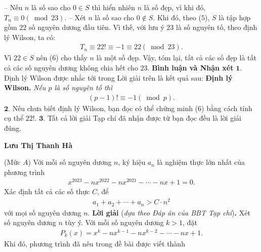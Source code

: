 \begin{multicols}{2}
	\vskip 0.05cm
	-- Nếu $n$ là số sao cho $0 \in S$ thì hiển nhiên $n$ là số đẹp, vì khi đó, ${T_n} \equiv 0\left( {\bmod 23} \right).$
	\vskip 0.05cm  
	-- Xét $n$ là số sao cho $0 \notin S$.
	\vskip 0.05cm  
	Khi đó, theo ($5$), $S$ là tập hợp gồm $22$ số nguyên dương đầu tiên. Vì thế, với lưu ý $23$ là số nguyên tố, theo định lý Wilson, ta có:
	\begin{align*}
		{T_n} \equiv 22! \equiv  - 1 \equiv 22\left( {\bmod 23} \right). \tag{$6$}
	\end{align*}
	Vì $22 \in S$ nên ($6$) cho thấy $n$ là một số đẹp.
	\vskip 0.05cm
	Vậy, tóm lại, tất cả các số đẹp là tất cả các số nguyên dương không chia hết cho $23$.
	\vskip 0.05cm
	\textbf{\color{thachthuctoanhoc}Bình luận và Nhận xét}
	\vskip 0.05cm
	$\pmb{1.}$ Định lý Wilson được nhắc tới trong Lời giải trên là kết quả sau:
	\vskip 0.05cm
	\textbf{\color{thachthuctoanhoc}Định lý Wilson.} \textit{Nếu $p$ là số nguyên tố thì}
	\begin{align*}
		\left( {p - 1} \right)! \equiv  - 1\left( {\bmod p} \right).
	\end{align*}
	$\pmb{2.}$ Nếu chưa biết định lý Wilson, bạn đọc có thể chứng minh ($6$) bằng cách tính cụ thể $22!$.
	\vskip 0.05cm
	$\pmb{3.}$ Tất cả lời giải Tạp chí đã nhận được từ bạn đọc đều là lời giải đúng.
	\begin{flushright}
		\textbf{\color{thachthuctoanhoc}Lưu Thị Thanh Hà}
	\end{flushright}
	{}
	(Mức $A$) Với mỗi số nguyên dương $n$, ký hiệu  $a_n$ là nghiệm thực lớn nhất của phương trình
	\begin{align*}
		{x^{2023}} - n{x^{2022}} - n{x^{2021}} -  \cdots  - nx + 1 = 0.
	\end{align*}
	Xác định tất cả các số thực $C$, để
	\begin{align*}
		{a_1} + {a_2} +  \cdots  + {a_n} > C \cdot {n^2}
	\end{align*}
	với mọi số nguyên dương $n$.
	\vskip 0.05cm
	\textbf{\color{thachthuctoanhoc}Lời giải} (\textit{dựa theo Đáp án của BBT Tạp chí})\textbf{\color{thachthuctoanhoc}.}
	\vskip 0.05cm
	Xét số nguyên dương $n$ tùy ý.
	\vskip 0.05cm
	Với mỗi số nguyên dương $k > 1$, đặt
	\begin{align*}
		{P_k}\left( x \right) = {x^k} - n{x^{k - 1}} - n{x^{k - 2}} -  \cdots  - nx + 1.
	\end{align*}
	Khi đó, phương trình đã nêu trong đề bài được viết thành
	\begin{align*}

\end{align*}
\end{multicols}
